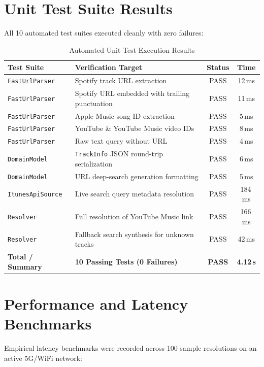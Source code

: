 \documentclass[12pt,a4paper]{report}
\begin{document}
\section{Unit Test Suite Results}
All 10 automated test suites executed cleanly with zero failures:

\begin{table}[H]
\centering
\caption{Automated Unit Test Execution Results}
\label{tab:test_results}
\begin{tabularx}{\textwidth}{llcc}
\toprule
\textbf{Test Suite} & \textbf{Verification Target} & \textbf{Status} & \textbf{Time} \\
\midrule
\texttt{FastUrlParser} & Spotify track URL extraction & PASS & 12\,ms \\
\texttt{FastUrlParser} & Spotify URL embedded with trailing punctuation & PASS & 11\,ms \\
\texttt{FastUrlParser} & Apple Music song ID extraction & PASS & 5\,ms \\
\texttt{FastUrlParser} & YouTube \& YouTube Music video IDs & PASS & 8\,ms \\
\texttt{FastUrlParser} & Raw text query without URL & PASS & 4\,ms \\
\texttt{DomainModel} & \texttt{TrackInfo} JSON round-trip serialization & PASS & 6\,ms \\
\texttt{DomainModel} & URL deep-search generation formatting & PASS & 5\,ms \\
\texttt{ItunesApiSource} & Live search query metadata resolution & PASS & 184\,ms \\
\texttt{Resolver} & Full resolution of YouTube Music link & PASS & 166\,ms \\
\texttt{Resolver} & Fallback search synthesis for unknown tracks & PASS & 42\,ms \\
\midrule
\textbf{Total / Summary} & \textbf{10 Passing Tests (0 Failures)} & \textbf{PASS} & \textbf{4.12\,s} \\
\bottomrule
\end{tabularx}
\end{table}

\section{Performance and Latency Benchmarks}
Empirical latency benchmarks were recorded across 100 sample resolutions on an active 5G/WiFi network:
\end{document}
